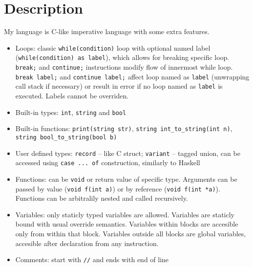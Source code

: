 \documentclass[a4paper,8pt]{extarticle}
\begin{document}
\section{Description}
My language is C-like imperative language with some extra features. 
\begin{itemize}
\item Loops: classic \texttt{while(condition)} loop with optional named label (\texttt{while(condition) as label}), which allows for breaking specific loop.
\texttt{break;} and \texttt{continue;} instructions modify flow of innermost while loop. \texttt{break label;} and \texttt{continue label;} affect 
loop named as \texttt{label} (unwrapping call stack if necessary) or result in error if no loop named as \texttt{label} is executed.
Labels cannot be overriden.
\item Built-in types: \texttt{int}, \texttt{string} and \texttt{bool}
\item Built-in functions: \texttt{print(string str)}, \texttt{string int\_to\_string(int n)}, \texttt{string bool\_to\_string(bool b)}
\item User defined types: \texttt{record} -- like C struct; \texttt{variant} -- tagged union, can be accessed using \texttt{case ... of} construction, similarly to Haskell
\item Functions: can be \texttt{void} or return value of specific type.
Arguments can be passed by value (\texttt{void f(int a)}) or by reference (\texttt{void f(int *a)}).
Functions can be arbitralily nested and called recursively.
\item Variables: only staticly typed variables are allowed. Variables are staticly bound with usual override semantics.
Variables within blocks are accesible only from within that block. Variables outside all blocks are global variables, accesible after declaration from any instruction.
\item Comments: start with \texttt{//} and ends with end of line
\end{itemize}
\newpage
\end{document}
